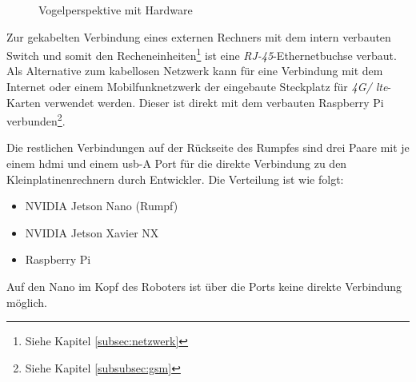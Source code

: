 \begin{figure}[h]
    \caption{Vogelperspektive mit Hardware}\label{fig:vogelperspektive}
\end{figure}

Zur gekabelten Verbindung eines externen Rechners mit dem intern verbauten Switch und somit den Recheneinheiten\footnote{Siehe Kapitel \ref{subsec:netzwerk}}
ist eine \emph{RJ-45}-Ethernetbuchse  verbaut.
Als Alternative zum kabellosen Netzwerk kann für eine Verbindung mit dem Internet oder einem Mobilfunknetzwerk der eingebaute
Steckplatz für \emph{4G/ \gls{lte}}-Karten  verwendet werden.
Dieser ist direkt mit dem verbauten Raspberry Pi verbunden\footnote{Siehe Kapitel \ref{subsubsec:gsm}}.

Die restlichen Verbindungen auf der Rückseite des Rumpfes sind drei Paare mit je einem \gls{hdmi} und einem \gls{usb}-A Port
für die direkte Verbindung zu den Kleinplatinenrechnern durch Entwickler.
Die Verteilung ist wie folgt:

\begin{itemize}
    \item {} NVIDIA Jetson Nano (Rumpf)
    \item {} NVIDIA Jetson Xavier NX
    \item {} Raspberry Pi
\end{itemize}

\noindent Auf den Nano im Kopf des Roboters ist über die Ports keine direkte Verbindung möglich.




